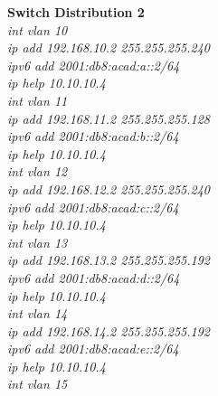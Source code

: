 \documentclass[12pt,a4paper]{report}
\begin{document}
\hspace*{1cm}\textbf{Switch Distribution 2}\\
\hspace*{2cm}\textit{int vlan 10\\
\hspace*{2cm}ip add 192.168.10.2 255.255.255.240\\
\hspace*{2cm}ipv6 add 2001:db8:acad:a::2/64\\
\hspace*{2cm}ip help 10.10.10.4\\
\hspace*{2cm}int vlan 11\\
\hspace*{2cm}ip add 192.168.11.2 255.255.255.128\\
\hspace*{2cm}ipv6 add 2001:db8:acad:b::2/64\\
\hspace*{2cm}ip help 10.10.10.4\\
\hspace*{2cm}int vlan 12\\
\hspace*{2cm}ip add 192.168.12.2 255.255.255.240\\
\hspace*{2cm}ipv6 add 2001:db8:acad:c::2/64\\
\hspace*{2cm}ip help 10.10.10.4\\
\hspace*{2cm}int vlan 13\\
\hspace*{2cm}ip add 192.168.13.2 255.255.255.192\\
\hspace*{2cm}ipv6 add 2001:db8:acad:d::2/64\\
\hspace*{2cm}ip help 10.10.10.4\\
\hspace*{2cm}int vlan 14\\
\hspace*{2cm}ip add 192.168.14.2 255.255.255.192\\
\hspace*{2cm}ipv6 add 2001:db8:acad:e::2/64\\
\hspace*{2cm}ip help 10.10.10.4\\
\hspace*{2cm}int vlan 15\\
}
\end{document}
